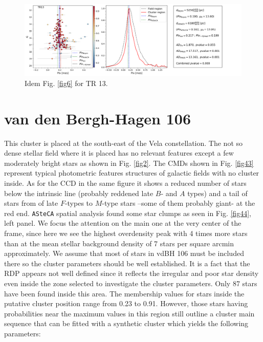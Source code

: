 \documentclass[draft]{aa}
\begin{document}
\begin{figure}[ht]
    \centering
    \includegraphics[width=\hsize]{../figs/plx_TR13.png}
    \caption{Idem Fig. \ref{fig6} for TR 13.}
    \label{fig42}
\end{figure}



\section{van den Bergh-Hagen 106}

This cluster is placed at the south-east of the Vela constellation. The not so
dense stellar field where it is placed has no relevant features except a few
moderately bright stars as shown in Fig. \ref{fig2}. The CMDs shown in
Fig. \ref{fig43} represent typical photometric features structures of galactic
fields with no cluster inside. As for the CCD in the same figure it shows a
reduced number of stars below the intrinsic line (probably reddened late $B$-
and $A$ types) and a tail of stars from of late $F$-types to $M$-type stars
–some of them probably giant- at the red end.
%
\texttt{ASteCA} spatial analysis found some star clumps as seen in Fig. 
\ref{fig44}, left panel. We focus the attention on the main one at the very
center of the frame, since here we see the highest overdensity peak with 4 times
more stars than at the mean stellar background density of 7 stars per square
arcmin approximately. We assume that most of stars in vdBH 106
must be included there so the cluster parameters should be well established. It
is a fact that the RDP appears not well defined since it reflects the irregular
and poor star density even inside the zone selected to investigate the cluster
parameters. Only 87 stars have been found inside this area. The
membership values for stars inside the putative cluster position range from 0.23
to 0.91. However, those stars having probabilities near the maximum values in
this region still outline a cluster main sequence that can be fitted with a
synthetic cluster which yields the following parameters:
\end{document}
